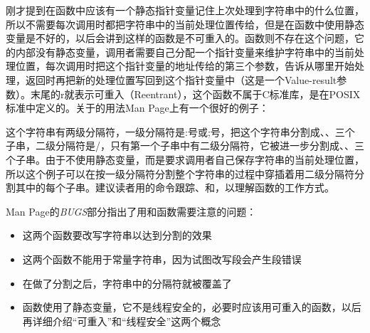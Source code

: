 刚才提到在函数中应该有一个静态指针变量记住上次处理到字符串中的什么位置，所以不需要每次调用时都把字符串中的当前处理位置传给，但是在函数中使用静态变量是不好的，以后会讲到这样的函数是不可重入的。函数则不存在这个问题，它的内部没有静态变量，调用者需要自己分配一个指针变量来维护字符串中的当前处理位置，每次调用时把这个指针变量的地址传给的第三个参数，告诉从哪里开始处理，返回时再把新的处理位置写回到这个指针变量中（这是一个Value-result参数）。末尾的r就表示可重入（Reentrant），这个函数不属于C标准库，是在POSIX标准中定义的。关于的用法Man Page上有一个很好的例子：






这个字符串有两级分隔符，一级分隔符是:号或;号，把这个字符串分割成、、三个子串，二级分隔符是/，只有第一个子串中有二级分隔符，它被进一步分割成、、三个子串。由于不使用静态变量，而是要求调用者自己保存字符串的当前处理位置，所以这个例子可以在按一级分隔符分割整个字符串的过程中穿插着用二级分隔符分割其中的每个子串。建议读者用的命令跟踪、和，以理解函数的工作方式。



Man Page的\emph{BUGS}部分指出了用和函数需要注意的问题：


\begin{itemize}

\item 这两个函数要改写字符串以达到分割的效果

\item 这两个函数不能用于常量字符串，因为试图改写段会产生段错误

\item 在做了分割之后，字符串中的分隔符就被覆盖了

\item {}函数使用了静态变量，它不是线程安全的，必要时应该用可重入的函数，以后再详细介绍“可重入”和“线程安全”这两个概念
\end{itemize}

